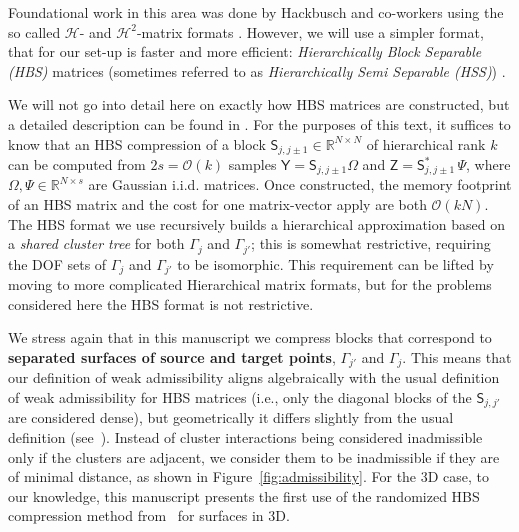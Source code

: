 \documentclass[final,onefignum,onetabnum]{siamart250211}
\newcommand{\mtx}[1]{\bm{\mathsf{#1}}}
\theoremstyle{definition}
\begin{document}
Foundational work in this area was done by Hackbusch and co-workers using the so called
$\mathcal{H}$- and $\mathcal{H}^{2}$-matrix formats
\cite{hackbusch,2008_bebendorf_book,2002_hackbusch_H2,2004_borm_hackbusch,2010_borm_book}.
However, we will use a simpler format, that for our set-up is faster and more efficient:
\textit{Hierarchically Block Separable (HBS)} matrices (sometimes referred to
as \textit{Hierarchically Semi Separable (HSS)})
\cite{2005_martinsson_fastdirect,2012_martinsson_FDS_survey,2009_xia_superfast,2013_xia_randomized,2010_gu_xia_HSS,2016_kressner_rankstructured_review}. 

We will not go into detail here on exactly how HBS matrices are constructed, but a detailed description can be found in \cite{fastHBS}. For the purposes of this text, it suffices to know that an HBS compression of a block $\mtx{S}_{j,j\pm1}\in \mathbb{R}^{N\times N}$ of hierarchical rank $k$ can be computed from $2s = \mathcal{O}(k)$ samples $\mtx{Y}=\mtx{S}_{j,j\pm1}\mtx{\Omega}$ and $\mtx{Z}=\mtx{S}_{j,j\pm1}^*\,\mtx{\Psi}$, where $\mtx{\Omega},\mtx{\Psi}\in \mathbb{R}^{N\times s}$ are Gaussian i.i.d. matrices. Once constructed, the memory footprint of an HBS matrix and the cost for one matrix-vector apply are both $\mathcal{O}(kN)$. The HBS format we use recursively builds a hierarchical approximation based on a \textit{shared cluster tree} for both $\Gamma_j$ and $\Gamma_{j'}$; this is somewhat restrictive, requiring the DOF sets of $\Gamma_{j}$ and $\Gamma_{j'}$ to be isomorphic. This requirement can be lifted by moving to more complicated Hierarchical matrix formats, but for the problems considered here the HBS format is not restrictive.

We stress again that in this manuscript we compress blocks that correspond to \textbf{separated surfaces of source and target points}, $\Gamma_{j'}$ and $\Gamma_j$. This means that our definition of weak admissibility aligns algebraically with the usual definition of weak admissibility for HBS matrices (i.e., only the diagonal blocks of the $\mtx{S}_{j,j'}$ are considered dense), but geometrically it differs slightly from the usual definition (see~\cite[Ch.~15]{2019_martinsson_fast_direct_solvers}). Instead of cluster interactions being considered inadmissible only if the clusters are adjacent, we consider them to be inadmissible if they are of minimal distance, as shown in Figure~\ref{fig:admissibility}. For the 3D case, to our knowledge, this manuscript presents the first use of the randomized HBS compression method from~\cite{fastHBS} for surfaces in 3D.
\end{document}
